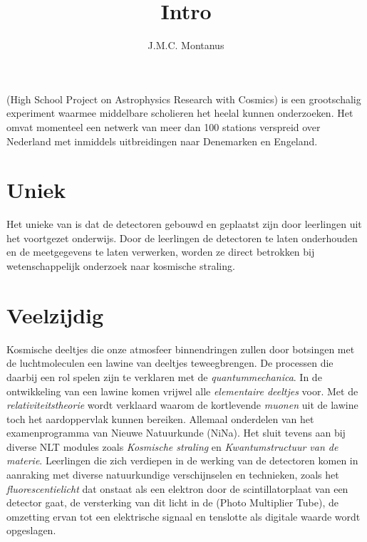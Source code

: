 

\title{Intro}
\author{J.M.C. Montanus}



\maketitle

\section{\hisparc}

\hisparc (High School Project on Astrophysics Research with Cosmics) is
een grootschalig experiment waarmee middelbare scholieren het heelal
kunnen onderzoeken. Het omvat momenteel een netwerk van meer dan 100
stations verspreid over Nederland met inmiddels uitbreidingen naar
Denemarken en Engeland.


\section{Uniek}

Het unieke van \hisparc is dat de detectoren gebouwd en geplaatst zijn
door leerlingen uit het voortgezet onderwijs. Door de leerlingen de detectoren te laten onderhouden en de
meetgegevens te laten verwerken, worden ze direct betrokken bij
wetenschappelijk onderzoek naar kosmische straling.


\section{Veelzijdig}

Kosmische deeltjes die onze atmosfeer binnendringen zullen door
botsingen met de luchtmoleculen een lawine van deeltjes teweegbrengen. De
processen die daarbij een rol spelen zijn te verklaren met de
\emph{quantummechanica}. In de ontwikkeling van een lawine komen vrijwel
alle \emph{elementaire deeltjes} voor. Met de
\emph{relativiteitstheorie} wordt verklaard waarom de kortlevende
\emph{muonen} uit de lawine toch het aardoppervlak kunnen bereiken. Allemaal onderdelen van het examenprogramma van Nieuwe Natuurkunde (NiNa). Het sluit tevens aan bij diverse NLT modules zoals \emph{Kosmische straling} en \emph{Kwantumstructuur van de materie}. Leerlingen die zich verdiepen in de werking van de detectoren komen in aanraking met diverse natuurkundige verschijnselen en technieken, zoals het
\emph{fluorescentielicht} dat onstaat als een elektron door de
scintillatorplaat van een \hisparc detector gaat, de versterking van dit
licht in de \pmt (Photo Multiplier Tube), de omzetting ervan tot een
elektrische signaal en tenslotte als digitale waarde wordt opgeslagen.


